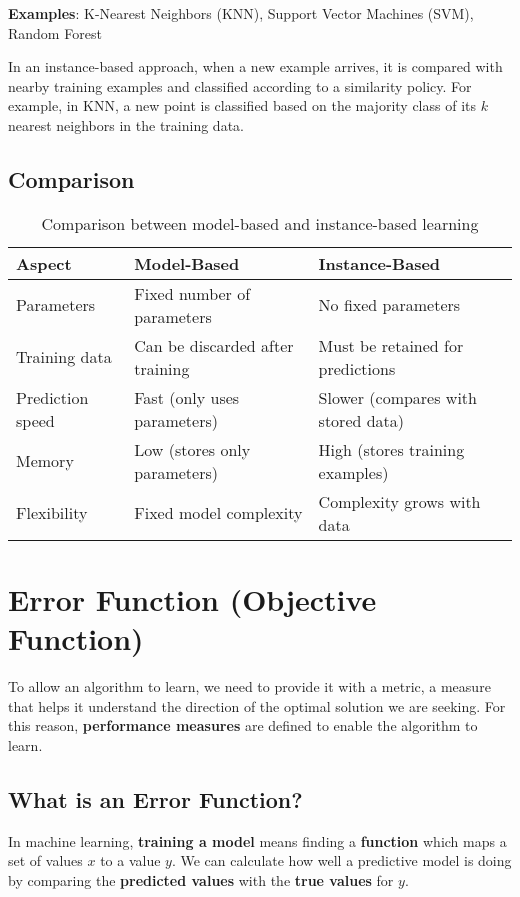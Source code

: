 \documentclass[11pt,a4paper]{article}
\theoremstyle{definition}
\theoremstyle{plain}
\theoremstyle{remark}
\begin{document}
\textbf{Examples}: K-Nearest Neighbors (KNN), Support Vector Machines (SVM), Random Forest

In an instance-based approach, when a new example arrives, it is compared with nearby training examples and classified according to a similarity policy. For example, in KNN, a new point is classified based on the majority class of its $k$ nearest neighbors in the training data.

\subsection{Comparison}

\begin{table}[h]
\centering
\begin{tabular}{|l|p{5.5cm}|p{5.5cm}|}
\hline
\textbf{Aspect} & \textbf{Model-Based} & \textbf{Instance-Based} \\
\hline
Parameters & Fixed number of parameters & No fixed parameters \\
\hline
Training data & Can be discarded after training & Must be retained for predictions \\
\hline
Prediction speed & Fast (only uses parameters) & Slower (compares with stored data) \\
\hline
Memory & Low (stores only parameters) & High (stores training examples) \\
\hline
Flexibility & Fixed model complexity & Complexity grows with data \\
\hline
\end{tabular}
\caption{Comparison between model-based and instance-based learning}
\end{table}

\section{Error Function (Objective Function)}

To allow an algorithm to learn, we need to provide it with a metric, a measure that helps it understand the direction of the optimal solution we are seeking. For this reason, \textbf{performance measures} are defined to enable the algorithm to learn.

\subsection{What is an Error Function?}

In machine learning, \textbf{training a model} means finding a \textbf{function} which maps a set of values $x$ to a value $y$. We can calculate how well a predictive model is doing by comparing the \textbf{predicted values} with the \textbf{true values} for $y$.
\end{document}
